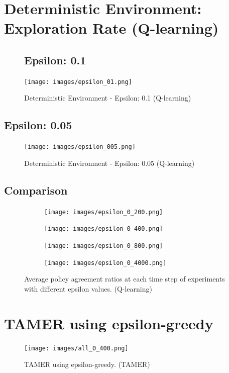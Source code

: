\documentclass{article}
\title{}
\author{}
\begin{document}
\section{Deterministic Environment: Exploration Rate (Q-learning)}
\begin{figure}[h]
\subsection{Epsilon: 0.1}
\texttt{[image: images/epsilon\_01.png]} 
\caption{Deterministic Environment - Epsilon: 0.1 (Q-learning)}
\end{figure}

\subsection{Epsilon: 0.05}
\begin{figure}[h]
\texttt{[image: images/epsilon\_005.png]} 
\caption{Deterministic Environment - Epsilon: 0.05 (Q-learning)}
\end{figure}


\subsection{Comparison}
\begin{figure}[h]
	\begin{subfigure}{0.5\textwidth}
		\texttt{[image: images/epsilon\_0\_200.png]} 
		\caption{}
	\end{subfigure}
	\begin{subfigure}{0.5\textwidth}
		\texttt{[image: images/epsilon\_0\_400.png]}
		\caption{}
	\end{subfigure}
	\begin{subfigure}{0.5\textwidth}
		\texttt{[image: images/epsilon\_0\_800.png]}
		\caption{}
	\end{subfigure}
	\begin{subfigure}{0.5\textwidth}
		\texttt{[image: images/epsilon\_0\_4000.png]}
		\caption{}
	\end{subfigure}
	\caption{Average policy agreement ratios at each time step of experiments with different epsilon values. (Q-learning)}
\end{figure}

\section{TAMER using epsilon-greedy}
\begin{figure}[h]
\texttt{[image: images/all\_0\_400.png]} 
\caption{TAMER using epsilon-greedy. (TAMER)}
\end{figure}
\end{document}

